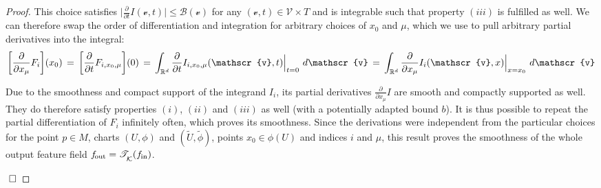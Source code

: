 \begin{proof}
    This choice satisfies 
    $\big| \frac{\partial}{\partial t} I(\mathscr{v},t) \big| \leq \mathscr{B}(\mathscr{v})$
    for any $(\mathscr{v},t) \in \mathscr{V} \times T$
    and is integrable such that property $(iii)$ is fulfilled as well.
    We can therefore swap the order of differentiation and integration for arbitrary choices of $x_0$ and $\mu$, which we use to pull arbitrary partial derivatives into the integral:
    \begin{align}
        \bigg[ \frac{\partial}{\partial x_\mu} F_i \bigg](x_0)
        \,=\, \bigg[ \frac{\partial}{\partial t} F_{i,x_0,\mu} \bigg](0)
        \,=\, \int_{\R^d} \frac{\partial}{\partial t} I_{i,x_0,\mu}(\mathscr{v},t) \Big|_{t=0}\ d\mathscr{v}
        \,=\, \int_{\R^d} \frac{\partial}{\partial x_\mu} I_i(\mathscr{v},x) \Big|_{x=x_0}\ d\mathscr{v}
    \end{align}

    Due to the smoothness and compact support of the integrand $I_i$, its partial derivatives $\frac{\partial}{\partial x_\mu} I$ are smooth and compactly supported as well.
    They do therefore satisfy properties $(i)$, $(ii)$ and $(iii)$ as well (with a potentially adapted bound $b$).
    It is thus possible to repeat the partial differentiation of $F_i$ infinitely often, which proves its smoothness.
    Since the derivations were independent from the particular choices for the point $p\in M$, charts $(U,\phi)$ and $(\widetilde{U},\widetilde{\phi})$, points $x_0\in\phi(U)$ and indices $i$ and $\mu$, this result proves the smoothness of the whole output feature field $f_\textup{\:\!\!out} = \mathscr{T}_{\overset{}{\mkern-0mu \mathcal{K}}}(f_\textup{\;\!\!in})$.

\NoEndMark
$~\hfill\Box$
\end{proof}
